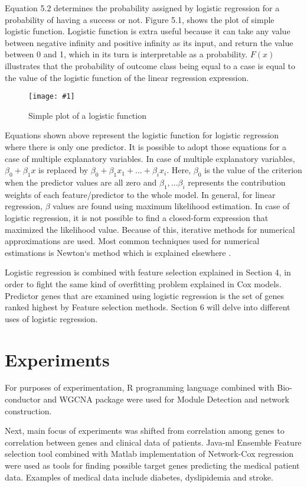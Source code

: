 \documentclass{ba-kecs}
\numberwithin{figure}{section}
\numberwithin{equation}{section}
\newcommand{\dkepic}[2]{ %
	\begin{figure}[H] %
	\texttt{[image: \#1]}
	\caption{#2}
	\label{#1}
	\end{figure}
}
\begin{document}
Equation 5.2 determines the probability assigned by logistic regression for a probability of having a success or not. Figure 5.1, shows the plot of simple logistic function. Logistic function is extra useful because it can take any value between negative infinity and positive infinity as its input, and return the value between 0 and 1, which in its turn is interpretable as a probability. $F(x)$ illustrates that the probability of outcome class being equal to a case is equal to the value of the logistic function of the linear regression expression.

\dkepic{logistic}{Simple plot of a logistic function}

Equations shown above represent the logistic function for logistic regression where there is only one predictor. It is possible to adopt those equations for a case of multiple explanatory variables. In case of multiple explanatory variables, $\beta_{0} + \beta_{1}x$ is replaced by $\beta_{0} + \beta_{1}x_{1} + ... + \beta_{i}x_{i}$. Here, $\beta_{0}$ is the value of the criterion when the predictor values are all zero and $\beta_{1}, ... \beta_{i}$ represents the contribution weights of each feature/predictor to the whole model. In general, for linear regression, $\beta$ values are found using maximum likelihood estimation. In case of logistic regression, it is not possible to find a closed-form expression that maximized the likelihood value. Because of this, iterative methods for numerical approximations are used. Most common techniques used for numerical estimations is Newton`s method which is explained elsewhere \cite{newton}.

Logistic regression is combined with feature selection explained in Section 4, in order to fight the same kind of overfitting problem explained in Cox models. Predictor genes that are examined using logistic regression is the set of genes ranked highest by Feature selection methods. Section 6 will delve into different uses of logistic regression.

\section{Experiments}

For purposes of experimentation, R programming language combined with Bio-conductor and WGCNA \cite{wgcna3} package were used for Module Detection and network construction.

Next, main focus of experiments was shifted from correlation among genes to correlation between genes and clinical data of patients. Java-ml \cite{javaml} Ensemble Feature selection tool combined with Matlab implementation of Network-Cox regression were used as tools for finding possible target genes predicting the medical patient data. Examples of medical data include diabetes, dyslipidemia and stroke.
\end{document}
